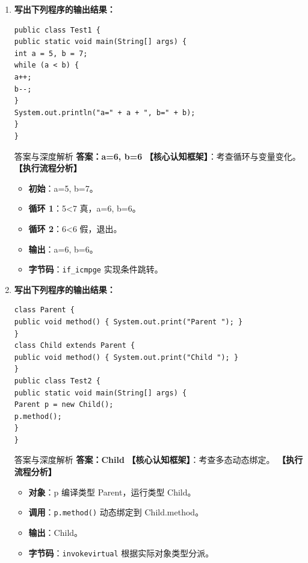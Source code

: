 \documentclass[12pt, a4paper]{ctexart}
\newcommand{\code}[1]{\texttt{\color{myblue}#1}}
\begin{document}
\begin{enumerate}[label=\arabic*.]
\item \textbf{写出下列程序的输出结果：}
\begin{lstlisting}
public class Test1 {
public static void main(String[] args) {
int a = 5, b = 7;
while (a < b) {
a++;
b--;
}
System.out.println("a=" + a + ", b=" + b);
}
}
\end{lstlisting}
\begin{bluebox}{答案与深度解析}
\textbf{答案：a=6, b=6}
\textbf{【核心认知框架】}：考查循环与变量变化。
\textbf{【执行流程分析】}
\begin{itemize}[leftmargin=*, nosep]
    \item \textbf{初始}：a=5, b=7。
    \item \textbf{循环 1}：5<7 真，a=6, b=6。
    \item \textbf{循环 2}：6<6 假，退出。
    \item \textbf{输出}：a=6, b=6。
    \item \textbf{字节码}：\code{if\_icmpge} 实现条件跳转。
\end{itemize}
\end{bluebox}

\item \textbf{写出下列程序的输出结果：}
\begin{lstlisting}
class Parent {
public void method() { System.out.print("Parent "); }
}
class Child extends Parent {
public void method() { System.out.print("Child "); }
}
public class Test2 {
public static void main(String[] args) {
Parent p = new Child();
p.method();
}
}
\end{lstlisting}
\begin{bluebox}{答案与深度解析}
\textbf{答案：Child }
\textbf{【核心认知框架】}：考查多态动态绑定。
\textbf{【执行流程分析】}
\begin{itemize}[leftmargin=*, nosep]
    \item \textbf{对象}：p 编译类型 Parent，运行类型 Child。
    \item \textbf{调用}：\code{p.method()} 动态绑定到 Child.method。
    \item \textbf{输出}：Child。
    \item \textbf{字节码}：\code{invokevirtual} 根据实际对象类型分派。
\end{itemize}
\end{bluebox}


\end{enumerate}
\end{document}
